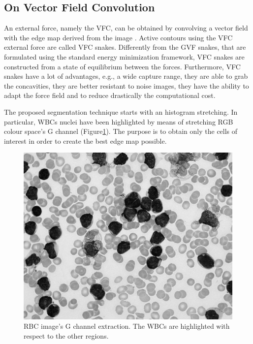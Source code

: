 \documentclass[final,a4paper,12pt,english]{UnicaPhdThesis3}
\begin{document}
\subsection{On Vector Field Convolution}
An external force, namely the VFC, can be obtained by convolving a vector field with the edge map derived from the image \cite{VFC}. 
Active contours using the VFC external force are called VFC snakes. Differently from the GVF \cite{GVF} snakes, that are formulated using the standard energy minimization framework, VFC snakes are constructed from a state of equilibrium between the forces. Furthermore, VFC snakes have a lot of advantages, e.g., a wide capture range, they are able to grab the concavities, they are better resistant to noise images, they have the ability to adapt the force field and to reduce drastically the computational cost.

The proposed segmentation technique starts with an histogram stretching. In particular, WBCs nuclei have been highlighted by means of stretching RGB colour space's G channel (Figure\ref{fig:GreenComp}).
The purpose is to obtain only the cells of interest in order to create the best edge map possible.

\begin{figure}[!b]
	\begin{center}
		\centering
		\includegraphics[scale=0.3]{images/2018_1_visapp/GreenComp.png}
		\caption{RBC image's G channel extraction. The WBCs are highlighted with respect to the other regions.}
		\label{fig:GreenComp}
	\end{center}
\end{figure}
\end{document}
